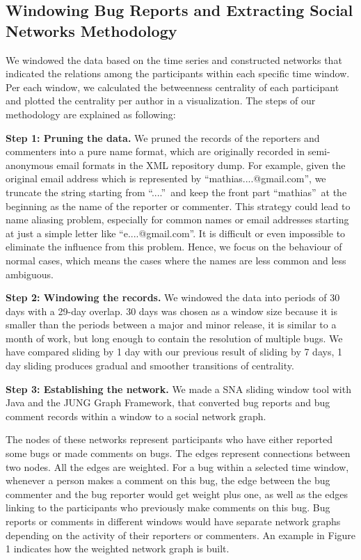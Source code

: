 \documentclass[10pt, conference, compsocconf]{IEEEtran}
\begin{document}
\subsection{Windowing Bug Reports and Extracting Social Networks Methodology}
We windowed the data based on the time series and constructed networks
that indicated the relations among the participants within each specific
time window. Per each window, we calculated the betweenness centrality of each
participant and plotted the centrality per author in a visualization. The steps of our methodology are
explained as following:


\textbf{Step 1: Pruning the data.} We pruned the records of the
reporters and commenters into a pure name format, which are originally
recorded in semi-anonymous email formats in the XML repository dump. 
For example, given the original email address which is represented by
\textquotedblleft mathias....@gmail.com\textquotedblright, we truncate
the string starting from \textquotedblleft ....\textquotedblright \
and keep the front part \textquotedblleft mathias\textquotedblright \
at the beginning as the name of the reporter or commenter. 
This strategy could lead to name aliasing problem, especially for
common names or email addresses starting at just a simple letter like
\textquotedblleft e....@gmail.com\textquotedblright.
 It is difficult or even impossible to eliminate the influence from
 this problem. Hence, we focus on the behaviour of normal cases, which
 means the cases where the names are less common and less ambiguous.


\textbf{Step 2: Windowing the records.} We windowed the data into
periods of 30 days with a 29-day overlap. 
30 days was chosen as a window size because it is smaller than the
periods between a major and minor release, it is similar to a month of
work, but long enough to contain the resolution of multiple bugs.
We have compared sliding by 1 day with our previous result of sliding by 7
days, 1 day sliding produces gradual and smoother transitions of
centrality.


\textbf{Step 3: Establishing the network.} We made a SNA sliding
window tool with Java and the JUNG Graph Framework, that converted bug
reports and bug comment records within a window to a social network graph.

The nodes of these networks represent participants who have either
reported some bugs or made comments on bugs. The edges represent
connections between two nodes. All the edges are weighted.  
For a bug within a selected time window, whenever a person
makes a comment on this bug, the edge between the bug commenter and
the bug reporter would get weight plus one, as well as the edges
linking to the participants who previously make comments on this
bug. Bug reports or comments in different windows would have separate
network graphs depending on the activity of their reporters or
commenters. An example in Figure 1 indicates how the weighted network
graph is built.
\end{document}
